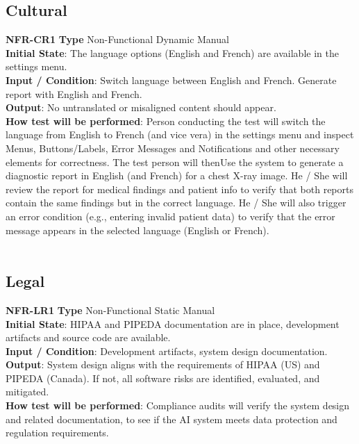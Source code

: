 \documentclass[12pt, titlepage]{article}
\begin{document}
\subsection{Cultural}
\noindent \textbf{NFR-CR1} \textbf{Type} Non-Functional Dynamic Manual\\
        \indent \textbf{Initial State}: The language options (English and French) are available in the settings menu.\\
        \indent \textbf{Input / Condition}: Switch language between English and French. Generate report with English and French. \\
        \indent \textbf{Output}: No untranslated or misaligned content should appear.\\
        \indent \textbf{How test will be performed}: Person conducting the test will switch the language from English to French (and vice vera) in the settings menu and inspect Menus, Buttons/Labels, Error Messages and Notifications and other necessary elements for correctness. The test person will thenUse the system to generate a diagnostic report in English (and French) for a chest X-ray image. He / She will review the report for medical findings and patient info to verify that both reports contain the same findings but in the correct language. He / She will also trigger an error condition (e.g., entering invalid patient data) to verify that the error message appears in the selected language (English or French).\\
        \\
\subsection{Legal}
\noindent \textbf{NFR-LR1} \textbf{Type} Non-Functional Static Manual\\
        \indent \textbf{Initial State}: HIPAA and PIPEDA documentation are in place, development artifacts and source code are available. \\
        \indent \textbf{Input / Condition}: Development artifacts, system design documentation.\\
        \indent \textbf{Output}: System design aligns with the requirements of HIPAA (US) and PIPEDA (Canada). If not, all software risks are identified, evaluated, and mitigated.\\
        \indent \textbf{How test will be performed}: Compliance audits will verify the system design and related documentation, to see if the AI system meets data protection and regulation requirements.\\
    \\
\end{document}
